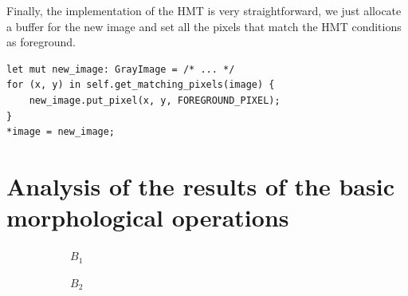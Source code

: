 \documentclass[12pt]{article}
\begin{document}
Finally, the implementation of the HMT is very straightforward, we just allocate a buffer for the new image
and set all the pixels that match the HMT conditions as foreground.

\begin{lstlisting}
let mut new_image: GrayImage = /* ... */
for (x, y) in self.get_matching_pixels(image) {
    new_image.put_pixel(x, y, FOREGROUND_PIXEL);
}
*image = new_image;
\end{lstlisting}

\pagebreak[2]
\section{Analysis of the results of the basic morphological operations}

\begin{figure}[H]\centering
    \begin{subfigure}[t]{.2\textwidth}\centering
        \caption{$B_1$}
    \end{subfigure}
    \begin{subfigure}[t]{.2\textwidth}\centering
        \caption{$B_2$}
    \end{subfigure}
    \begin{subfigure}[t]{.2\textwidth}\centering

\end{subfigure}
\end{figure}
\end{document}
